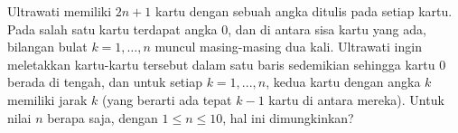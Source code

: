 \documentclass[12pt]{scrartcl}
\begin{document}
\begin{soaljawab}
    Ultrawati memiliki $2n + 1$ kartu dengan sebuah angka ditulis pada setiap kartu. Pada salah satu kartu terdapat angka 0, dan di antara sisa kartu yang ada, bilangan bulat $k = 1, \dots, n$ muncul masing-masing dua kali. Ultrawati ingin meletakkan kartu-kartu tersebut dalam satu baris sedemikian sehingga kartu 0 berada di tengah, dan untuk setiap $k = 1, ..., n$, kedua kartu dengan angka $k$ memiliki jarak $k$ (yang berarti ada tepat $k - 1$ kartu di antara mereka). Untuk nilai $n$ berapa saja, dengan $1 \le n \le 10$, hal ini dimungkinkan?
\end{soaljawab}
\end{document}

